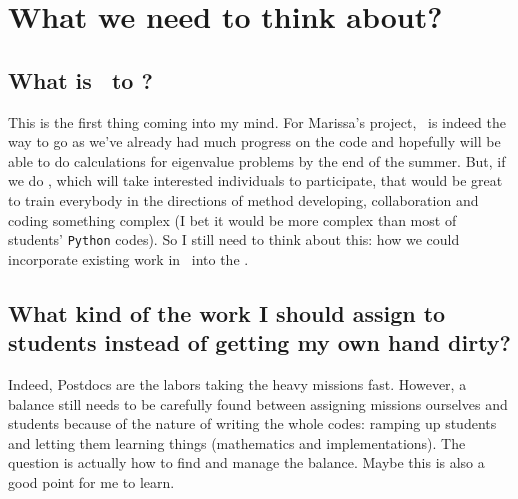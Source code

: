 \documentclass[letterpaper,11pt]{texMemo}
\begin{document}
\section{What we need to think about?}
{
	\subsection{What is \xtrans\ to \bart?}
	{
		This is the first thing coming into my mind. For Marissa's project, \xtrans\ is indeed the way to go as we've already had much progress on the code and hopefully will be able to do calculations for eigenvalue problems by the end of the summer. But, if we do \bart, which will take interested individuals to participate, that would be great to train everybody in the directions of method developing, collaboration and coding something complex (I bet it would be more complex than most of students' {\tt Python} codes). So I still need to think about this: how we could incorporate existing work in \xtrans\ into the \bart. 
	}
	
	\subsection{What kind of the work I should assign to students instead of getting my own hand dirty?}
	{
		Indeed, Postdocs are the labors taking the heavy missions fast. However, a balance still needs to be carefully found between assigning missions ourselves and students because of the nature of writing the whole codes: ramping up students and letting them learning things (mathematics and implementations). The question is actually how to find and manage the balance. Maybe this is also a good point for me to learn.
	}
}


\end{document}
